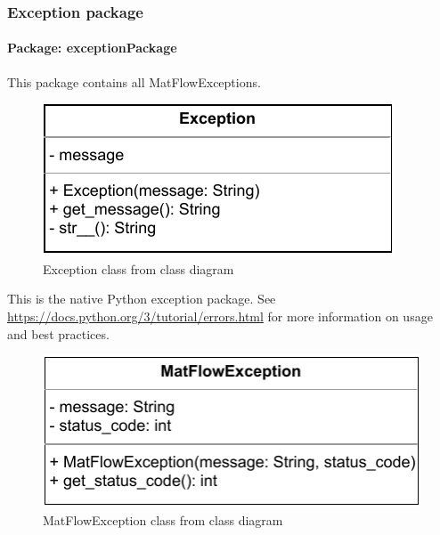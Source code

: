 \subsubsection{Exception package}

\paragraph{Package: exceptionPackage}This package contains all MatFlowExceptions.


\begin{figure}[H]
        \centerline{\includegraphics[scale=1]{res/Klassen/Exception.pdf}}
        \caption{Exception class from class diagram}
\end{figure}

This is the native Python exception package. See \url{https://docs.python.org/3/tutorial/errors.html} 
for more information on usage and best practices.


\begin{figure}[H]
        \centerline{\includegraphics[scale=1]{res/Klassen/MatFlowException.pdf}}
        \caption{MatFlowException class from class diagram}
\end{figure}

